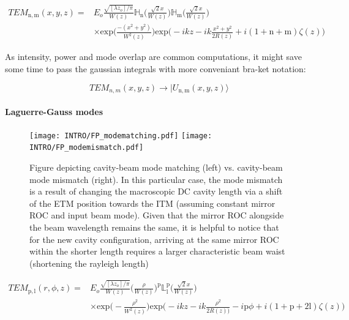 \begin{equation}\label{eq:HG_beam}
	\begin{split}
		TEM_\mathrm{n,m}(x,y,z) = & E_o \frac{\sqrt{[\lambda z_o] / \pi}}{W(z)}\mathbb{H}_\mathrm{n}\bigg(\frac{\sqrt{2}x}{W(z)}\bigg)\mathbb{H}_\mathrm{m}\bigg(\frac{\sqrt{2}x}{W(z)}\bigg)\\
					& \times \mathrm{exp}\bigg(\frac{-(x^2+y^2)}{W^2(z)}\bigg) \mathrm{exp}\bigg(-ikz - ik\frac{x^2 + y^2}{2R(z)} + i (1+\mathrm{n}+\mathrm{m})\zeta(z)\bigg)
	\end{split}
\end{equation}


As intensity, power and mode overlap are common computations, it might save some time to pass the gaussian integrals with more conveniant bra-ket notation:

$$TEM_{n,m}(x,y,z) \rightarrow | U_\mathrm{n,m}(x,y,z)\rangle$$

\paragraph*{Laguerre-Gauss modes}
\begin{figure}[H]
\begin{subcaptiongroup}
	\texttt{[image: INTRO/FP\_modematching.pdf]}
	\hspace{3.5mm}
	\texttt{[image: INTRO/FP\_modemismatch.pdf]}
\end{subcaptiongroup}
\hfill
\caption{Figure depicting cavity-beam mode matching (left) vs. cavity-beam mode mismatch (right). In this particular case, the mode mismatch is a result of changing the macroscopic DC cavity length via a shift of the ETM position towards the ITM (assuming constant mirror ROC and input beam mode). Given that the mirror ROC alongside the beam wavelength remains the same, it is helpful to notice that for the new cavity configuration, arriving at the same mirror ROC within the shorter length requires a larger characteristic beam waist (shortening the rayleigh length)}
\label{fig:fp_modemismatch}
\end{figure}

\begin{equation}\label{eq:LG_beam}
	\begin{split}
	TEM_\mathrm{p,l}(r,\phi,z) = & E_o \frac{\sqrt{[\lambda z_o] / \pi}}{W(z)} \bigg(\frac{\rho}{W(z)}\bigg)^\mathrm{p}\mathbb{L}^{\mathrm{p}}_{\mathrm{l}}\bigg(\frac{\sqrt{2}x}{W(z)}\bigg)\\
				   &  \times \mathrm{exp}\bigg(-\frac{\rho^2}{W^2(z)}\bigg) \mathrm{exp}\bigg(-ikz - ik\frac{\rho^2}{2R(z))} - i\mathrm{p}\phi + i (1+\mathrm{p}+2\mathrm{l})\zeta(z)\bigg)
	\end{split}
\end{equation}

